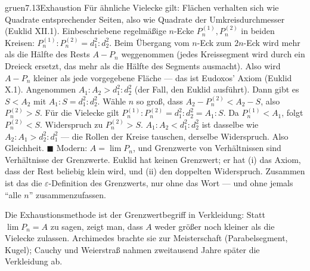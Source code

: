 \begin{loesungkarte}{gruen}{7.13}{Exhaustion}
Für ähnliche Vielecke gilt: Flächen verhalten sich wie Quadrate entsprechender Seiten, also wie Quadrate der Umkreisdurchmesser (Euklid XII.1). Einbeschriebene regelmäßige $n$-Ecke $P_n^{(1)}, P_n^{(2)}$ in beiden Kreisen: $P_n^{(1)} : P_n^{(2)} = d_1^{2} : d_2^{2}$.
Beim Übergang vom $n$-Eck zum $2n$-Eck wird mehr als die Hälfte des Rests $A - P_n$ weggenommen (jedes Kreissegment wird durch ein Dreieck ersetzt, das mehr als die Hälfte des Segments ausmacht). Also wird $A - P_n$ kleiner als jede vorgegebene Fläche --- das ist Eudoxos' Axiom (Euklid X.1).
Angenommen $A_1 : A_2 > d_1^{2} : d_2^{2}$ (der Fall, den Euklid ausführt). Dann gibt es $S < A_2$ mit $A_1 : S = d_1^{2} : d_2^{2}$. Wähle $n$ so groß, dass $A_2 - P_n^{(2)} < A_2 - S$, also $P_n^{(2)} > S$. Für die Vielecke gilt $P_n^{(1)} : P_n^{(2)} = d_1^{2} : d_2^{2} = A_1 : S$. Da $P_n^{(1)} < A_1$, folgt $P_n^{(2)} < S$. Widerspruch zu $P_n^{(2)} > S$.
$A_1 : A_2 < d_1^{2} : d_2^{2}$ ist dasselbe wie $A_2 : A_1 > d_2^{2} : d_1^{2}$ --- die Rollen der Kreise tauschen, derselbe Widerspruch. Also Gleichheit. $\blacksquare$
Modern: $A = \lim P_n$, und Grenzwerte von Verhältnissen sind Verhältnisse der Grenzwerte. Euklid hat keinen Grenzwert; er hat (i) das Axiom, dass der Rest beliebig klein wird, und (ii) den doppelten Widerspruch. Zusammen ist das die $\varepsilon$-Definition des Grenzwerts, nur ohne das Wort --- und ohne jemals \enquote{alle $n$} zusammenzufassen.
\begin{mitnehmen}\kastentext
Die Exhaustionsmethode ist der Grenzwertbegriff in Verkleidung: Statt $\lim P_n = A$ zu sagen, zeigt man, dass $A$ weder größer noch kleiner als die Vielecke zulassen. Archimedes brachte sie zur Meisterschaft (Parabelsegment, Kugel); Cauchy und Weierstraß nahmen zweitausend Jahre später die Verkleidung ab.
\end{mitnehmen}
\end{loesungkarte}

